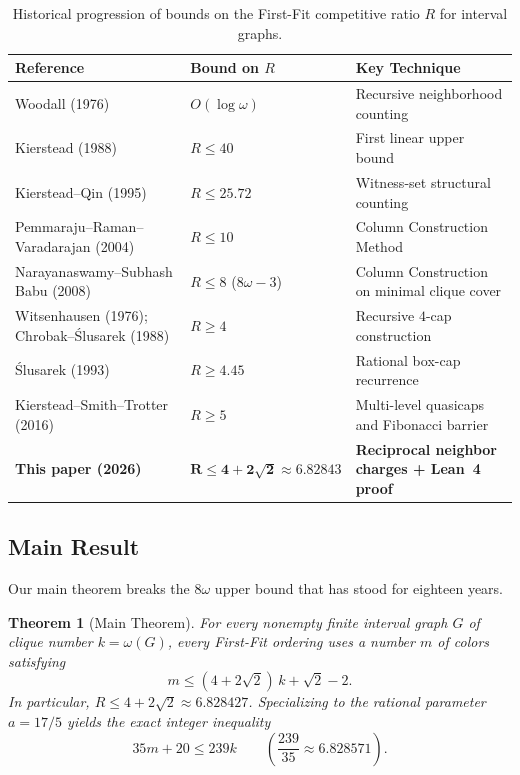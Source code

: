 \documentclass[11pt,a4paper]{article}
\newtheorem{theorem}{Theorem}
\theoremstyle{remark}
\begin{document}
\begin{table}[!htbp]
\centering
\caption{Historical progression of bounds on the First-Fit competitive ratio $R$ for interval graphs.}
\label{tab:history}
\begin{tabularx}{\linewidth}{l l X}
\toprule
\textbf{Reference} & \textbf{Bound on $R$} & \textbf{Key Technique} \\
\midrule
Woodall (1976)~\cite{woodall76} & $O(\log \omega)$ & Recursive neighborhood counting \\
Kierstead (1988)~\cite{kierstead88} & $R \le 40$ & First linear upper bound \\
Kierstead--Qin (1995)~\cite{kq95} & $R \le 25.72$ & Witness-set structural counting \\
Pemmaraju--Raman--Varadarajan (2004)~\cite{prv04} & $R \le 10$ & Column Construction Method \\
Narayanaswamy--Subhash Babu (2008)~\cite{nsb08} & $R \le 8$ ($8\omega - 3$) & Column Construction on minimal clique cover \\
\midrule
Witsenhausen (1976); Chrobak--\'{S}lusarek (1988)~\cite{cs88} & $R \ge 4$ & Recursive $4$-cap construction \\
\'{S}lusarek (1993)~\cite{slusarek93} & $R \ge 4.45$ & Rational box-cap recurrence \\
Kierstead--Smith--Trotter (2016)~\cite{kst16} & $R \ge 5$ & Multi-level quasicaps and Fibonacci barrier \\
\midrule
\textbf{This paper (2026)} & $\mathbf{R \le 4 + 2\sqrt{2} \approx 6.82843}$ & \textbf{Reciprocal neighbor charges + Lean~4 proof} \\
\bottomrule
\end{tabularx}
\end{table}

\subsection{Main Result}

Our main theorem breaks the $8\omega$ upper bound that has stood for eighteen years.

\begin{theorem}[Main Theorem]\label{thm:main}
For every nonempty finite interval graph $G$ of clique number $k = \omega(G)$, every First-Fit ordering uses a number $m$ of colors satisfying
\begin{equation}\label{eq:main}
  m \le (4 + 2\sqrt{2})\,k + \sqrt{2} - 2.
\end{equation}
In particular, $R \le 4 + 2\sqrt{2} \approx 6.828427$. Specializing to the rational parameter $a = 17/5$ yields the exact integer inequality
\begin{equation}\label{eq:rational}
  35m + 20 \le 239k \qquad \left(\frac{239}{35} \approx 6.828571\right).
\end{equation}
\end{theorem}
\end{document}
